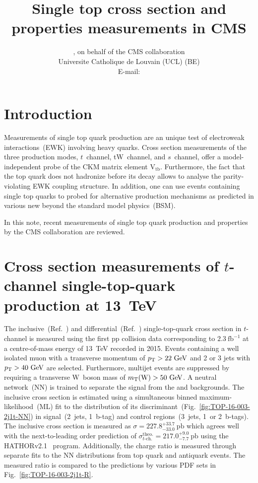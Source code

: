 \documentclass{PoS}
\title{Single top cross section and properties measurements in CMS}
\author{
    \speaker{Matthias Komm}, on behalf of the CMS collaboration\\
    Universite Catholique de Louvain (UCL) (BE)\\
    E-mail: \email{Matthias.Komm@cern.ch}
}
\begin{document}
\section{Introduction}
Measurements of single top quark production are an unique test of electroweak interactions~(EWK) involving heavy quarks. Cross section measurements of the three production modes, $t$~channel, tW~channel, and $s$~channel, offer a model-independent probe of the CKM matrix element $\mathrm{V}_\mathrm{tb}$. Furthermore, the fact that the top quark does not hadronize before its decay allows to analyse the parity-violating EWK coupling structure. In addition, one can use events containing single top quarks to probed for alternative production mechanisms as predicted in various new beyond the standard model physics~(BSM).

In this note, recent measurements of single top quark production and properties by the CMS collaboration are reviewed.


\section{Cross section measurements of $t$-channel single-top-quark production at 13~TeV}

The inclusive~(Ref.~\cite{CMS-PAS-TOP-16-003}) and differential~(Ref.~\cite{CMS-PAS-TOP-16-004}) single-top-quark cross section in $t$-channel is measured using the first pp collision data corresponding to $2.3~\mathrm{fb^{-1}}$ at a centre-of-mass energy of 13~TeV recorded in 2015. Events containing a well isolated muon with a transverse momentum of $p_\mathrm{T}>22~\mathrm{GeV}$ and 2 or 3 jets with $p_\mathrm{T}>40~\mathrm{GeV}$ are selected. Furthermore, multijet events are suppressed by requiring a transverse W~boson mass of $m_{\mathrm{T}}(\mathrm{W})>50~\mathrm{GeV}$. A neutral network~(NN) is trained to separate the signal from the \wjets and \ttbar backgrounds. The inclusive cross section is estimated using a simultaneous binned maximum-likelihood~(ML) fit to the distribution of its discriminant~(Fig.~\ref{fig:TOP-16-003-2j1t-NN}) in signal~(2~jets, 1~b-tag) and control regions~(3~jets, 1~or 2~b-tags). The inclusive cross section is measured as $\sigma=227.8^{+33.7}_{-33.0}~\mathrm{pb}$ which agrees well with the next-to-leading order prediction of $\sigma_{t\mbox{-}\mathrm{ch.}}^\mathrm{theo.}=217.0^{+9.0}_{-7.7}~\mathrm{pb}$ using the \textsc{HATHOR}v2.1~\cite{hathor} program. Additionally, the charge ratio is measured through separate fits to the NN distributions from top quark and antiquark events. The measured ratio is compared to the predictions by various PDF sets in Fig.~\ref{fig:TOP-16-003-2j1t-R}.
\end{document}
